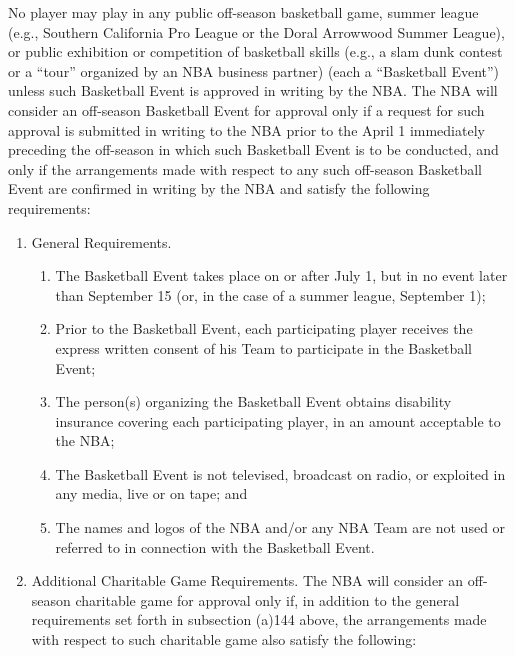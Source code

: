 \documentclass[
]{book}
\providecommand{\tightlist}{%
  \setlength{\itemsep}{0pt}\setlength{\parskip}{0pt}}
\begin{document}
No player may play in any public off-season basketball game, summer league (e.g., Southern California Pro League or the Doral Arrowwood Summer League), or public exhibition or competition of basketball skills (e.g., a slam dunk contest or a ``tour'' organized by an NBA business partner) (each a ``Basketball Event'') unless such Basketball Event is approved in writing by the NBA. The NBA will consider an off-season Basketball Event for approval only if a request for such approval is submitted in writing to the NBA prior to the April 1 immediately preceding the off-season in which such Basketball Event is to be conducted, and only if the arrangements made with respect to any such off-season Basketball Event are confirmed in writing by the NBA and satisfy the following requirements:

\begin{enumerate}
\def\labelenumi{(\alph{enumi})}
\tightlist
\item
  General Requirements.

  \begin{enumerate}
  \def\labelenumii{(\roman{enumii})}
  \tightlist
  \item
    The Basketball Event takes place on or after July 1, but in no event later than September 15 (or, in the case of a summer league, September 1);
  \item
    Prior to the Basketball Event, each participating player receives the express written consent of his Team to participate in the Basketball Event;
  \item
    The person(s) organizing the Basketball Event obtains disability insurance covering each participating player, in an amount acceptable to the NBA;
  \item
    The Basketball Event is not televised, broadcast on radio, or exploited in any media, live or on tape; and
  \item
    The names and logos of the NBA and/or any NBA Team are not used or referred to in connection with the Basketball Event.
  \end{enumerate}
\item
  Additional Charitable Game Requirements. The NBA will consider an off-season charitable game for approval only if, in addition to the general requirements set forth in subsection (a)144 above, the arrangements made with respect to such charitable game also satisfy the following:


\end{enumerate}
\end{document}
